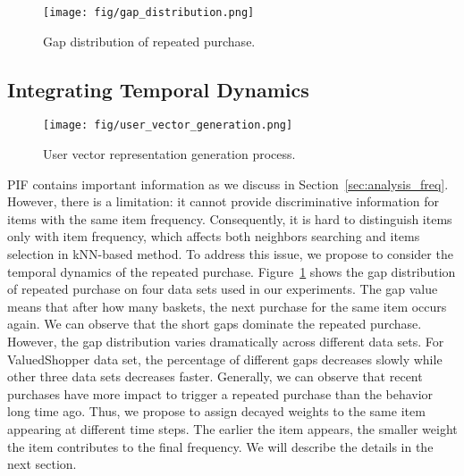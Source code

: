 \documentclass[sigconf]{acmart}
\begin{document}
\begin{figure}[!t]
\centerline{\texttt{[image: fig/gap\_distribution.png]}}
\caption{Gap distribution of repeated purchase.}
\label{fig:gap_distribution}
\end{figure}

\subsection{Integrating Temporal Dynamics}






\begin{figure*}[!t]
\centerline{\texttt{[image: fig/user\_vector\_generation.png]}}
\caption{User vector representation generation process.}
\label{fig:user_vector}
\end{figure*}

PIF contains important information as we discuss in Section~\ref{sec:analysis_freq}. However, there is a limitation: it  cannot provide  discriminative information for items with the same item frequency. Consequently,  it is hard to  distinguish items only with item frequency, which affects both neighbors searching and items selection in kNN-based method. To address this issue, we propose to consider the temporal dynamics of the repeated purchase.  Figure~\ref{fig:gap_distribution} shows the gap distribution of repeated purchase on four data sets used in our experiments. The gap value means that after  how many baskets, the next purchase for the same item occurs again. We can observe that the short gaps dominate the repeated purchase. However, the gap distribution varies dramatically across different data sets. For ValuedShopper data set, the percentage of different gaps decreases slowly while other three data sets decreases faster. Generally, we can observe that recent purchases have more impact to trigger a repeated purchase than the behavior long time ago. Thus, we propose to assign decayed weights to the same item appearing at different time steps. The earlier the item appears, the smaller weight the item contributes to the final  frequency. We will describe the details in the next section. 
\end{document}
